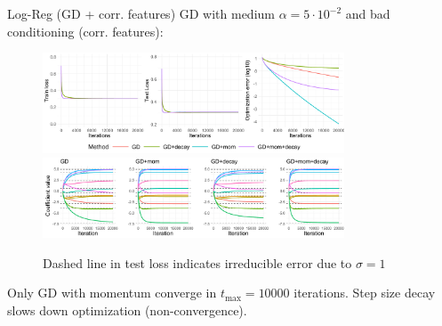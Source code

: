\documentclass[11pt,compress,t,notes=noshow, xcolor=table]{beamer}
\begin{document}
\begin{vbframe}{Log-Reg (GD + corr. features)}
\vspace{-0.4cm}
GD with medium $\alpha=5\cdot10^{-2}$ and bad conditioning (corr. features):
\begin{figure}
            \includegraphics[width=0.8\textwidth]{slides/04-multivariate-first-order/figure_man/simu_linmod/GD_log_med_lr_corr_iters.pdf} \\
             \includegraphics[width=0.8\textwidth]{slides/04-multivariate-first-order/figure_man/simu_linmod/GD_log_coef_med_corr.pdf}\\
            \begin{footnotesize}
                Dashed line in test loss indicates irreducible error due to $\sigma=1$
            \end{footnotesize}
\end{figure}
Only GD with momentum converge in $t_{\text{max}}=10000$ iterations. Step size decay slows down optimization (non-convergence).
\end{vbframe}
\end{document}
